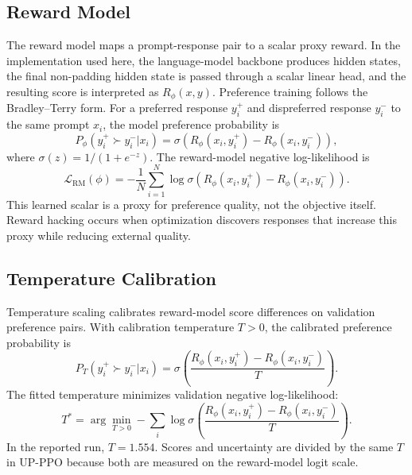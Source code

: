 \documentclass[11pt]{article}
\newcommand{\Rphi}{R_{\phi}}
\begin{document}
\subsection{Reward Model}
The reward model maps a prompt-response pair to a scalar proxy reward. In the implementation used here, the language-model backbone produces hidden states, the final non-padding hidden state is passed through a scalar linear head, and the resulting score is interpreted as $\Rphi(x,y)$. Preference training follows the Bradley--Terry form. For a preferred response $y_i^+$ and dispreferred response $y_i^-$ to the same prompt $x_i$, the model preference probability is
\begin{equation}
    P_\phi(y_i^+ \succ y_i^-|x_i)
    =\sigma\left(\Rphi(x_i,y_i^+)-\Rphi(x_i,y_i^-)\right),
\end{equation}
where $\sigma(z)=1/(1+e^{-z})$. The reward-model negative log-likelihood is
\begin{equation}
    \mathcal{L}_{\mathrm{RM}}(\phi)
    =-\frac{1}{N}\sum_{i=1}^{N}
    \log \sigma\left(\Rphi(x_i,y_i^+)-\Rphi(x_i,y_i^-)\right).
\end{equation}
This learned scalar is a proxy for preference quality, not the objective itself. Reward hacking occurs when optimization discovers responses that increase this proxy while reducing external quality.

\subsection{Temperature Calibration}
Temperature scaling calibrates reward-model score differences on validation preference pairs. With calibration temperature $T>0$, the calibrated preference probability is
\begin{equation}
    P_T(y_i^+ \succ y_i^-|x_i)
    =\sigma\left(\frac{\Rphi(x_i,y_i^+)-\Rphi(x_i,y_i^-)}{T}\right).
\end{equation}
The fitted temperature minimizes validation negative log-likelihood:
\begin{equation}
    T^*=\arg\min_{T>0} -\sum_i
    \log \sigma\left(\frac{\Rphi(x_i,y_i^+)-\Rphi(x_i,y_i^-)}{T}\right).
\end{equation}
In the reported run, $T=1.554$. Scores and uncertainty are divided by the same $T$ in UP-PPO because both are measured on the reward-model logit scale.
\end{document}
